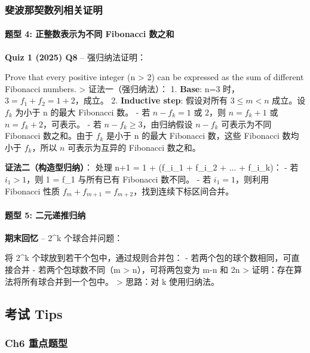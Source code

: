 \documentclass[10pt,a4paper,openany]{ctexbook}
\theoremstyle{definition}
\theoremstyle{remark}
\renewenvironment{quote}
  {\list{}{\leftmargin=1em\rightmargin=0pt\topsep=0.5pt\partopsep=0pt}\item[]}
  {\endlist}
\begin{document}
\subsubsection{斐波那契数列相关证明}

\paragraph{题型 4: 正整数表示为不同 Fibonacci 数之和}

\textbf{Quiz 1 (2025) Q8} -- 强归纳法证明：
\begin{quote}
Prove that every positive integer (n > 2) can be expressed as the sum of different Fibonacci numbers.
>
证法一（强归纳法）：
1. \textbf{Base}: n=3 时，$3 = f_1 + f_2 = 1 + 2$，成立。
2. \textbf{Inductive step}: 假设对所有 $3 \le m < n$ 成立。设 $f_k$ 为小于 n 的最大 Fibonacci 数。
   - 若 $n - f_k = 1$ 或 $2$，则 $n = f_k + 1$ 或 $n = f_k + 2$，可表示。
   - 若 $n - f_k \ge 3$，由归纳假设 $n - f_k$ 可表示为不同 Fibonacci 数之和。由于 $f_k$ 是小于 n 的最大 Fibonacci 数，这些 Fibonacci 数均小于 $f_k$，所以 $n$ 可表示为互异的 Fibonacci 数之和。

\textbf{证法二（构造型归纳）}：
处理 n+1 = 1 + (f\_{i\_1} + f\_{i\_2} + ... + f\_{i\_k})：
- 若 $i_1 > 1$，则 1 = f\_1 与所有已有 Fibonacci 数不同。
- 若 $i_1 = 1$，则利用 Fibonacci 性质 $f_m + f_{m+1} = f_{m+2}$，找到连续下标区间合并。

\end{quote}

\paragraph{题型 5: 二元递推归纳}

\textbf{期末回忆} -- 2\^{}k 个球合并问题：
\begin{quote}
将 2\^{}k 个球放到若干个包中，通过规则合并包：
- 若两个包的球个数相同，可直接合并
- 若两个包球数不同（m > n），可将两包变为 m-n 和 2n
>
证明：存在算法将所有球合并到一个包中。
>
思路：对 k 使用归纳法。

\end{quote}
\vspace{-2pt}

\subsection{考试 Tips}

\subsubsection{Ch6 重点题型}
\end{document}
